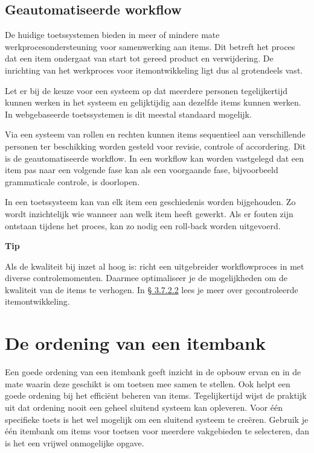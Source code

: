 \documentclass[
]{book}
\begin{document}
\hypertarget{geautomatiseerde-workflow}{%
\subsection{Geautomatiseerde workflow}\label{geautomatiseerde-workflow}}

De huidige toetssystemen bieden in meer of mindere mate werkprocesondersteuning voor samenwerking aan items. Dit betreft het proces dat een item ondergaat van start tot gereed product en verwijdering. De inrichting van het werkproces voor itemontwikkeling ligt dus al grotendeels vast.

Let er bij de keuze voor een systeem op dat meerdere personen tegelijkertijd kunnen werken in het systeem en gelijktijdig aan dezelfde items kunnen werken. In webgebaseerde toetssystemen is dit meestal standaard mogelijk.

Via een systeem van rollen en rechten kunnen items sequentieel aan verschillende personen ter beschikking worden gesteld voor revisie, controle of accordering. Dit is de geautomatiseerde workflow. In een workflow kan worden vastgelegd dat een item pas naar een volgende fase kan als een voorgaande fase, bijvoorbeeld grammaticale controle, is doorlopen.

In een toetssysteem kan van elk item een geschiedenis worden bijgehouden. Zo wordt inzichtelijk wie wanneer aan welk item heeft gewerkt. Als er fouten zijn ontstaan tijdens het proces, kan zo nodig een roll-back worden uitgevoerd.

\textbf{Tip}

Als de kwaliteit bij inzet al hoog is: richt een uitgebreider workflowproces in met diverse controlemomenten. Daarmee optimaliseer je de mogelijkheden om de kwaliteit van de items te verhogen. In \protect\hyperlink{gecontroleerde-itemontwikkeling-door-review}{§ 3.7.2.2} lees je meer over gecontroleerde itemontwikkeling.

\hypertarget{de-ordening-van-een-itembank}{%
\section{De ordening van een itembank}\label{de-ordening-van-een-itembank}}

Een goede ordening van een itembank geeft inzicht in de opbouw ervan en in de mate waarin deze geschikt is om toetsen mee samen te stellen. Ook helpt een goede ordening bij het efficiënt beheren van items. Tegelijkertijd wijst de praktijk uit dat ordening nooit een geheel sluitend systeem kan opleveren. Voor één specifieke toets is het wel mogelijk om een sluitend systeem te creëren. Gebruik je één itembank om items voor toetsen voor meerdere vakgebieden te selecteren, dan is het een vrijwel onmogelijke opgave.
\end{document}
